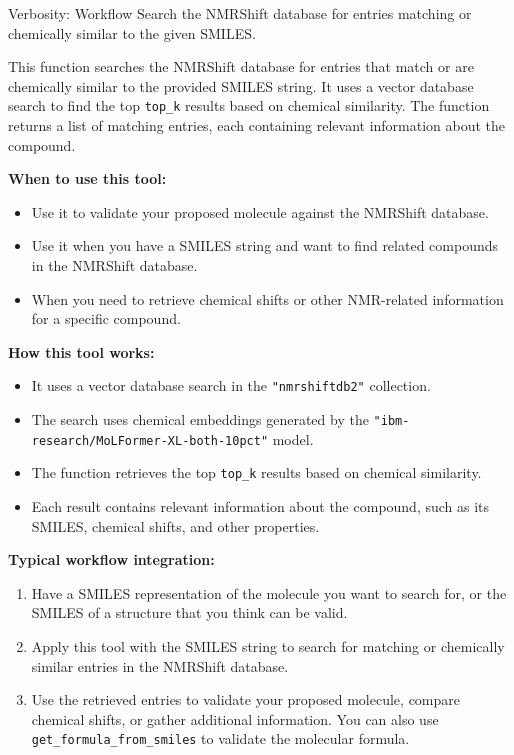  \begin{hypobox}{Verbosity: Workflow}
    Search the NMRShift database for entries matching or chemically similar to the given SMILES.

    This function searches the NMRShift database for entries that match or are chemically similar to the provided SMILES string. It uses a vector database search to find the top
  \texttt{top\_k} results based on chemical similarity. The function returns a list of matching entries, each containing relevant information about the compound.

    \textbf{When to use this tool:}
    \begin{itemize}[nosep]
      \item Use it to validate your proposed molecule against the NMRShift database.
      \item Use it when you have a SMILES string and want to find related compounds in the NMRShift database.
      \item When you need to retrieve chemical shifts or other NMR-related information for a specific compound.
    \end{itemize}

    \textbf{How this tool works:}
    \begin{itemize}[nosep]
      \item It uses a vector database search in the \texttt{"nmrshiftdb2"} collection.
      \item The search uses chemical embeddings generated by the \texttt{"ibm-research/MoLFormer-XL-both-10pct"} model.
      \item The function retrieves the top \texttt{top\_k} results based on chemical similarity.
      \item Each result contains relevant information about the compound, such as its SMILES, chemical shifts, and other properties.
    \end{itemize}

    \textbf{Typical workflow integration:}
    \begin{enumerate}[nosep]
      \item Have a SMILES representation of the molecule you want to search for, or the SMILES of a structure that you think can be valid.
      \item Apply this tool with the SMILES string to search for matching or chemically similar entries in the NMRShift database.
      \item Use the retrieved entries to validate your proposed molecule, compare chemical shifts, or gather additional information. You can also use \texttt{get\_formula\_from\_smiles} to
   validate the molecular formula.
    \end{enumerate}


\end{hypobox}
